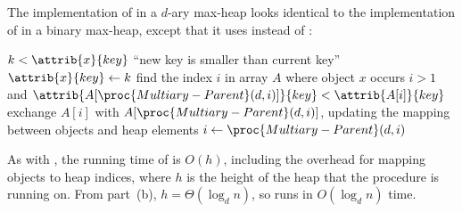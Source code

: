 The implementation of  in a $d$-ary max-heap looks identical to the implementation of  in a binary max-heap, except that it uses  instead of :

\begin{codebox}
\li \If $k<\attrib{x}{key}$
\li     \Then \Error ``new key is smaller than current key''
        \End
\li $\attrib{x}{key}\gets k$ \label{li:multiary-max-heap-increase-key-update-key}
\li find the index $i$ in array $A$ where object $x$ occurs
\li \While $i>1$ and $\attrib{A[\proc{Multiary-Parent}(d,i)]}{key}<\attrib{A[i]}{key}$
\li     \Do exchange $A[i]$ with $A[\proc{Multiary-Parent}(d,i)]$,
\zi         \>updating the mapping between objects and heap elements
\li         $i\gets\proc{Multiary-Parent}(d,i)$
        \End
\end{codebox}

As with , the running time of  is $O(h)$, including the overhead for mapping objects to heap indices, where $h$ is the height of the heap that the procedure is running on.
From part~(b), $h=\Theta(\log_dn)$, so  runs in $O(\log_dn)$ time.
